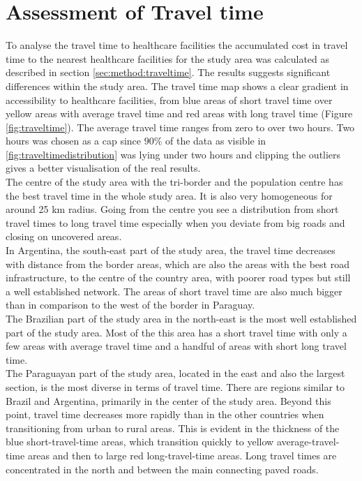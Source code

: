 \documentclass[11pt, a4paper]{report}
\begin{document}
\section{Assessment of Travel time}
To analyse the travel time to healthcare facilities the accumulated cost in travel time to the nearest healthcare facilities  for the study area was calculated as described in section \ref{sec:method:traveltime}. The results suggests significant differences within the study area. The travel time map shows a clear gradient in accessibility to healthcare facilities, from blue areas of short travel time over yellow areas with average travel time and red areas with long travel time (Figure \ref{fig:traveltime}). The average travel time ranges from zero to over two hours. Two hours was chosen as a cap since $90\%$ of the data as visible in \ref{fig:traveltimedistribution} was lying under two hours and clipping the outliers gives a better visualisation of the real results.\\
%
The centre of the study area with the tri-border and the population centre has the best travel time in the whole study area. It is also very homogeneous for around 25 km radius. Going from the centre you see a distribution from short travel times to long travel time especially when you deviate from big roads and closing on uncovered areas.\\
%
In Argentina, the south-east part of the study area, the travel time decreases with distance from the border areas, which are also the areas with the best road infrastructure, to the centre of the country area, with poorer road types but still a well established network. The areas of short travel time are also much bigger than in comparison to the west of the border in Paraguay.\\
%
The Brazilian part of the study area in the north-east is the most well established part of the study area. Most of the this area has a short travel time with only a few areas with average travel time and a handful of areas with short long travel time. \\
%
The Paraguayan part of the study area, located in the east and also the largest section, is the most diverse in terms of travel time. There are regions similar to Brazil and Argentina, primarily in the center of the study area. Beyond this point, travel time decreases more rapidly than in the other countries when transitioning from urban to rural areas. This is evident in the thickness of the blue short-travel-time areas, which transition quickly to yellow average-travel-time areas and then to large red long-travel-time areas. Long travel times are concentrated in the north and between the main connecting paved roads.
\end{document}
